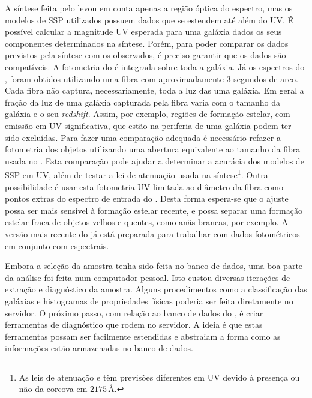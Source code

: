 A síntese feita pelo \starlight levou em conta apenas a região óptica do
espectro, mas os modelos de SSP utilizados possuem dados que se estendem até
além do UV. É possível calcular a magnitude UV esperada para uma galáxia dados
os seus componentes determinados na síntese. Porém, para poder comparar os dados
previstos pela síntese com os observados, é preciso garantir que os dados são
compatíveis. A fotometria do \galex é integrada sobre toda a galáxia. Já os
espectros do \SDSS, foram obtidos utilizando uma fibra com aproximadamente $3$
segundos de arco. Cada fibra não captura, necessariamente, toda a luz das uma
galáxia. Em geral a fração da luz de uma galáxia capturada pela fibra varia com
o tamanho da galáxia e o seu {\em redshift}. Assim, por exemplo, regiões de
formação estelar, com emissão em UV significativa, que estão na periferia de uma
galáxia podem ter sido excluídas. Para fazer uma comparação adequada é
necessário refazer a fotometria dos objetos \galex utilizando uma abertura
equivalente ao tamanho da fibra usada no \SDSS. Esta comparação pode ajudar a
determinar a acurácia dos modelos de SSP em UV, além de testar a lei de
atenuação usada na síntese\footnote{As leis de atenuação
\citet*[CCM]{Cardelli1989} e \citet*{Calzetti1994} têm previsões diferentes em
UV devido à presença ou não da corcova em $2175\,\text{\AA}$.}. Outra
possibilidade é usar esta fotometria UV limitada ao diâmetro da fibra como
pontos extras do espectro de entrada do \starlight. Desta forma espera-se que o
ajuste possa ser mais sensível à formação estelar recente, e possa separar uma
formação estelar fraca de objetos velhos e quentes, como anãs brancas, por
exemplo. A versão mais recente do \starlight já está preparada para trabalhar
com dados fotométricos em conjunto com espectrais.

Embora a seleção da amostra tenha sido feita no banco de dados, uma boa parte da
análise foi feita num computador pessoal. Isto custou diversas iterações de
extração e diagnóstico da amostra. Alguns procedimentos como a classificação das
galáxias e histogramas de propriedades físicas poderia ser feita diretamente no
servidor. O próximo passo, com relação ao banco de dados do \starlight, é criar
ferramentas de diagnóstico que rodem no servidor. A ideia é que estas
ferramentas possam ser facilmente estendidas e abstraiam a forma como as
informações estão armazenadas no banco de dados.


